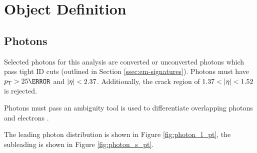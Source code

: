 \section{Object Definition}
\subsection{Photons}

Selected photons for this analysis are converted or unconverted photons which pass tight ID cuts (outlined in Section \ref{ssec:em-signatures}). Photons must have $\pt > \unit{25}{\GeV}$ and $|\eta| < 2.37$. Additionally, the crack region of $1.37 < |\eta| < 1.52$ is rejected.

Photons must pass an ambiguity tool is used to differentiate overlapping photons and electrons \cite{r1-photonID}.

The leading photon \pt distribution is shown in Figure \ref{fig:photon_l_pt}, the subleading is shown in Figure \ref{fig:photon_s_pt}.

